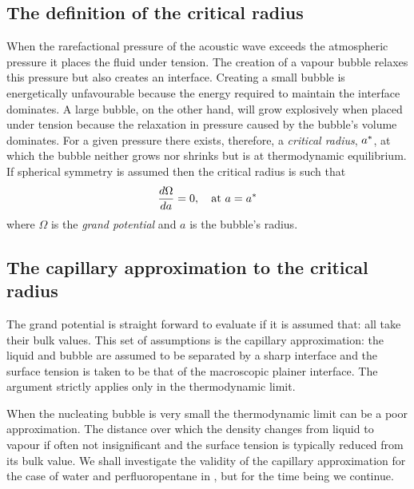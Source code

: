 \subsection{The definition of the critical radius}



When the rarefactional pressure of the acoustic wave exceeds the atmospheric pressure it places the fluid under tension.
The creation of a vapour bubble  relaxes this pressure but  also creates an interface.
Creating a small bubble is energetically unfavourable because the energy required to maintain the interface dominates.
A large bubble, on the other hand, will grow explosively when placed under tension because the relaxation in pressure caused by the bubble's volume dominates.
For a given pressure there exists, therefore, a {\em critical radius}, ${a^\ast}$, at which the bubble neither grows nor shrinks 
but is at thermodynamic equilibrium.
If  spherical symmetry is assumed then 
the critical radius is such that\cite{Oxtoby1992,Oxtoby1988}
\begin{align}
  \frac{d \Omega}{d a} =0,\quad\text{at $a = {a^\ast}$} \label{eqn:nuc:astarR}
\end{align}
where $\Omega$ is the {\em grand potential} and $a$ is the bubble's radius.

\subsection{The capillary approximation to the critical radius}\label{sec:nuc:capillary}

%
The grand potential is straight forward to evaluate if it is assumed that:
all take their bulk values.
This set of assumptions is the capillary approximation:
the liquid and bubble are assumed to be separated by a sharp interface and
the surface tension is taken to be that of the macroscopic plainer interface.
The argument strictly applies only in the thermodynamic limit.

When the nucleating bubble is very small the thermodynamic limit can be a poor approximation\cite{Talanquer1995}.
The distance over which the density changes from liquid to vapour if often not insignificant %
and the surface tension is typically reduced from its bulk value\cite{Kiang1971}.
We shall investigate the validity of the capillary approximation for the case of water and perfluoropentane in , 
but for the time being we continue.

